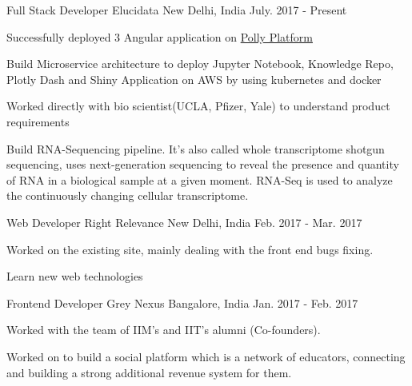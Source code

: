 

\begin{cventries}


\cventry
{Full Stack Developer}
{Elucidata} %
{New Delhi, India} %
{July. 2017 - Present} %
{ %
\begin{cvitems}
\item {Successfully deployed 3 Angular application on }
\href{https://resources.elucidata.io/polly}{Polly Platform}
\item {Build Microservice architecture to deploy Jupyter Notebook, Knowledge Repo, Plotly Dash and Shiny Application on AWS by using kubernetes and docker}
\item {Worked directly with bio scientist(UCLA, Pfizer, Yale) to understand product requirements}
\item {Build RNA-Sequencing pipeline. It's also called whole transcriptome shotgun sequencing, uses next-generation sequencing to reveal the presence and quantity of RNA in a biological sample at a given moment. RNA-Seq is used to analyze the continuously changing cellular transcriptome.}
\end{cvitems}
}


\cventry
{Web Developer} %
{Right Relevance} %
{New Delhi, India} %
{Feb. 2017 - Mar. 2017} %
{ %
\begin{cvitems}
\item {Worked on the existing site, mainly dealing with the front end bugs fixing.}
\item {Learn new web technologies}
\end{cvitems}
}


\cventry
{Frontend Developer} %
{Grey Nexus} %
{Bangalore, India} %
{Jan. 2017 - Feb. 2017} %
{ %
\begin{cvitems}
\item {Worked with the team of IIM’s and IIT’s alumni (Co-founders).}
\item {Worked on to build a social platform which is a network of educators, connecting and building a strong additional revenue system for them.}
\end{cvitems}
}


\end{cventries}
